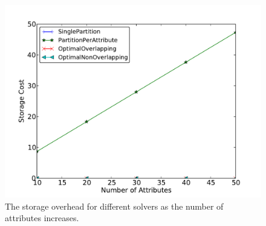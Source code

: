 \begin{figure}[t]
\centerline{\includegraphics[width=0.9\columnwidth]{figures/StorageOverheadVsNumAttributes.pdf}}
\caption{The storage overhead for different solvers as the number of attributes increases.}
\end{figure}



